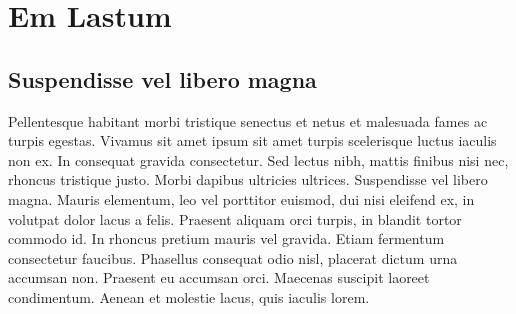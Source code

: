 \chapter{Em Lastum}

\section{Suspendisse vel libero magna}
Pellentesque habitant morbi tristique senectus et netus et malesuada fames ac turpis egestas.
 Vivamus sit amet ipsum sit amet turpis scelerisque luctus iaculis non ex. In consequat 
 gravida consectetur. Sed lectus nibh, mattis finibus nisi nec, rhoncus tristique justo. 
 Morbi dapibus ultricies ultrices. Suspendisse vel libero magna. Mauris elementum, leo 
 vel porttitor euismod, dui nisi eleifend ex, in volutpat dolor lacus a felis. Praesent
 aliquam orci turpis, in blandit tortor commodo id. In rhoncus pretium mauris vel gravida. 
 Etiam fermentum consectetur faucibus. Phasellus consequat odio nisl, placerat dictum urna 
 accumsan non. Praesent eu accumsan orci. Maecenas suscipit laoreet condimentum. Aenean et 
 molestie lacus, quis iaculis lorem.